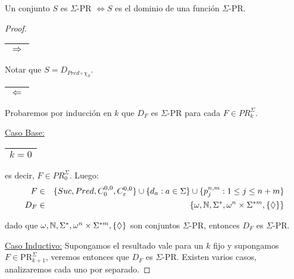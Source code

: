   \begin{proposition}
    \PN Un conjunto $S$ es $\Sigma$-PR $\Leftrightarrow S$ es el dominio de una función $\Sigma$-PR.
  \end{proposition}
  \begin{proof}
    \begin{tabular}{|c|} \hline $\Rightarrow$ \\\hline \end{tabular} Notar que $S = D_{Pred \circ \chi_{S}}$.

    \PN \begin{tabular}{|c|} \hline $\Leftarrow$ \\\hline \end{tabular} Probaremos por inducción en $k$ que $D_{F}$ es
    $\Sigma$-PR para cada $F \in PR_{k}^{\Sigma}$.

    \vspace{3mm}
    \PN \underline{Caso Base:} \begin{tabular}{|c|} \hline $k = 0$ \\\hline \end{tabular} es decir, $F
    \in PR_{0}^{\Sigma}$. Luego:
    \begin{eqnarray*}
      F &\in& \{Suc, Pred, C_{0}^{0,0}, C_{\varepsilon}^{0,0}\} \cup \{d_{a}: a \in \Sigma\} \cup \{p_{j}^{n,m}: 1 \leq
      j \leq n+m\} \\
      D_{F} &\in& \{\omega, \mathbb{N}, \Sigma^{\ast}, \omega^{n} \times \Sigma^{\ast m}, \{\Diamond\}\}
    \end{eqnarray*}

    \PN dado que $\omega, \mathbb{N}, \Sigma^{\ast}, \omega^{n} \times \Sigma^{\ast m}, \{\Diamond\}$ son conjuntos
    $\Sigma$-PR, entonces $D_{F}$ es $\Sigma$-PR.

    \vspace{3mm}
    \PN \underline{Caso Inductivo:} Supongamos el resultado vale para un $k$ fijo y supongamos $F \in
    \mathrm{PR}_{k+1}^{\Sigma}$, veremos entonces que $D_{F}$ es $\Sigma$-PR. Existen varios casos, analizaremos cada
    uno por separado.


\end{proof}
